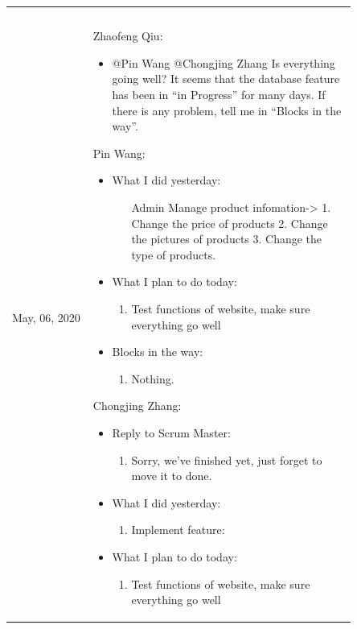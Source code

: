 \documentclass{report}
\begin{document}
\begin{tabularx}{0.95\linewidth}{%
  >{\raggedright\arraybackslash}p{0.2\linewidth}%
  >{\raggedright\arraybackslash}p{0.65\linewidth}}
\begin{itemize}
  \end{itemize}
  \\
  \\
  \midrule
  May, 06, 2020
  & 
  Zhaofeng Qiu:
  \begin{itemize}
    \item @Pin Wang @Chongjing Zhang Is everything going well? It seems that the database feature has been in “in Progress” for many days. If there is any problem, tell me in “Blocks in the way”.
  \end{itemize}
  Pin Wang:
  \begin{itemize}
    \item What I did yesterday: 
    \begin{enumerate}
      \item [Admin] Manage product infomation-> 1. Change the price of products 2. Change the pictures of products 3. Change the type of products.
    \end{enumerate}
    \item What I plan to do today: 
    \begin{enumerate}
      \item Test functions of website, make sure everything go well
    \end{enumerate}
    \item Blocks in the way: 
    \begin{enumerate}
      \item Nothing.
    \end{enumerate}
  \end{itemize}
  Chongjing Zhang:
  \begin{itemize}
    \item Reply to Scrum Master:
    \begin{enumerate}
      \item Sorry, we've finished yet, just forget to move it to done.
    \end{enumerate}
    \item What I did yesterday: 
    \begin{enumerate}
      \item Implement feature: 
    \end{enumerate}
    \item What I plan to do today:
      \begin{enumerate}
        \item Test functions of website, make sure everything go well
      \end{enumerate}

\end{itemize}
\end{tabularx}
\end{document}
